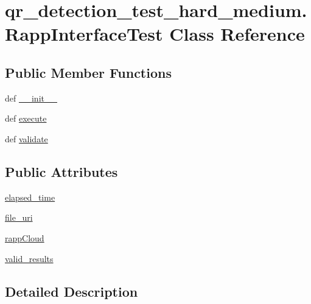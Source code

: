 \hypertarget{classqr__detection__test__hard__medium_1_1RappInterfaceTest}{\section{qr\-\_\-detection\-\_\-test\-\_\-hard\-\_\-medium.\-Rapp\-Interface\-Test Class Reference}
\label{classqr__detection__test__hard__medium_1_1RappInterfaceTest}
}
\subsection*{Public Member Functions}
\begin{DoxyCompactItemize}
\item 
def \hyperlink{classqr__detection__test__hard__medium_1_1RappInterfaceTest_acf94a29b5663c8d25d4853d553cbb9b1}{\-\_\-\-\_\-init\-\_\-\-\_\-}
\item 
def \hyperlink{classqr__detection__test__hard__medium_1_1RappInterfaceTest_a0481ff1433505089891abb7a07084ff0}{execute}
\item 
def \hyperlink{classqr__detection__test__hard__medium_1_1RappInterfaceTest_a4c1321a245332ad7630a0ae02612927e}{validate}
\end{DoxyCompactItemize}
\subsection*{Public Attributes}
\begin{DoxyCompactItemize}
\item 
\hyperlink{classqr__detection__test__hard__medium_1_1RappInterfaceTest_a7e3c71574bdf6153944e5433036d4fb8}{elapsed\-\_\-time}
\item 
\hyperlink{classqr__detection__test__hard__medium_1_1RappInterfaceTest_af8167c87b7b9c474f57f62430b248c69}{file\-\_\-uri}
\item 
\hyperlink{classqr__detection__test__hard__medium_1_1RappInterfaceTest_a94bdd9f61052253fb7a07d21142a1d74}{rapp\-Cloud}
\item 
\hyperlink{classqr__detection__test__hard__medium_1_1RappInterfaceTest_a6387be354239f9a786ad7c404272d7a0}{valid\-\_\-results}
\end{DoxyCompactItemize}


\subsection{Detailed Description}


